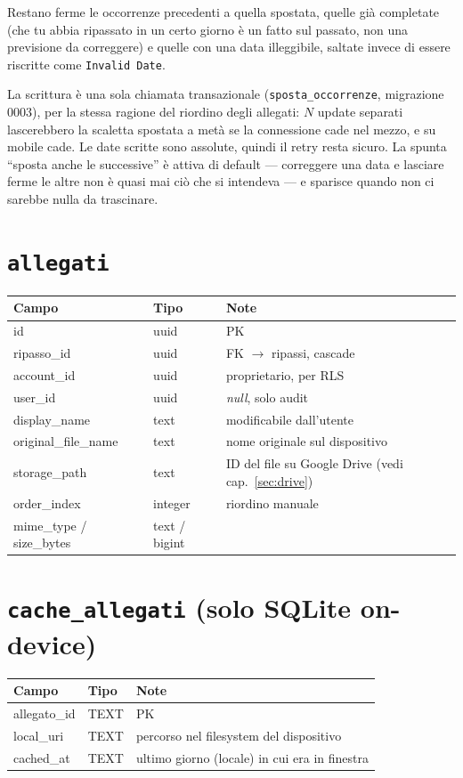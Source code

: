 \documentclass[11pt,a4paper]{report}
\begin{document}
Restano ferme le occorrenze precedenti a quella spostata, quelle gi\`a
completate (che tu abbia ripassato in un certo giorno \`e un fatto sul passato,
non una previsione da correggere) e quelle con una data illeggibile, saltate
invece di essere riscritte come \texttt{Invalid Date}.

La scrittura \`e una sola chiamata transazionale (\texttt{sposta\_occorrenze},
migrazione 0003), per la stessa ragione del riordino degli allegati: $N$ update
separati lascerebbero la scaletta spostata a met\`a se la connessione cade nel
mezzo, e su mobile cade. Le date scritte sono assolute, quindi il retry resta
sicuro. La spunta ``sposta anche le successive'' \`e attiva di default ---
correggere una data e lasciare ferme le altre non \`e quasi mai ci\`o che si
intendeva --- e sparisce quando non ci sarebbe nulla da trascinare.

\section{\texttt{allegati}}
\begin{center}
\begin{tabular}{@{}lll@{}}
\toprule
\textbf{Campo} & \textbf{Tipo} & \textbf{Note} \\
\midrule
id & uuid & PK \\
ripasso\_id & uuid & FK $\rightarrow$ ripassi, cascade \\
account\_id & uuid & proprietario, per RLS \\
user\_id & uuid & \textit{null}, solo audit \\
display\_name & text & modificabile dall'utente \\
original\_file\_name & text & nome originale sul dispositivo \\
storage\_path & text & ID del file su Google Drive (vedi cap.~\ref{sec:drive}) \\
order\_index & integer & riordino manuale \\
mime\_type / size\_bytes & text / bigint & \\
\bottomrule
\end{tabular}
\end{center}

\section{\texttt{cache\_allegati} (solo SQLite on-device)}
\begin{center}
\begin{tabular}{@{}lll@{}}
\toprule
\textbf{Campo} & \textbf{Tipo} & \textbf{Note} \\
\midrule
allegato\_id & TEXT & PK \\
local\_uri & TEXT & percorso nel filesystem del dispositivo \\
cached\_at & TEXT & ultimo giorno (locale) in cui era in finestra \\
\bottomrule
\end{tabular}
\end{center}
\end{document}
